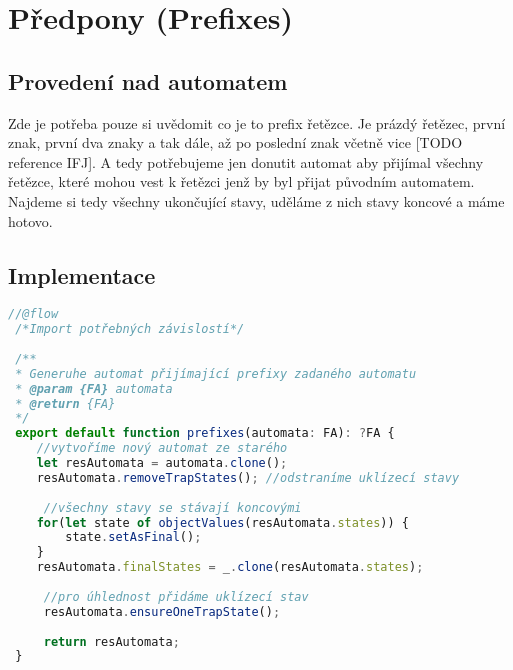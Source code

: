 \section{Předpony (Prefixes)}
\subsection{Provedení nad automatem}
Zde je potřeba pouze si uvědomit co je to prefix řetězce. Je prázdý řetězec, první znak, první dva znaky a tak dále, až po poslední znak včetně vice [TODO reference IFJ].  A tedy potřebujeme jen donutit automat aby přijímal všechny řetězce, které mohou vest k řetězci jenž by byl přijat původním automatem. Najdeme si tedy všechny ukončující stavy, uděláme z nich stavy koncové a máme hotovo.

\subsection{Implementace} 
 \begin{lstlisting}[language=JavaScript,caption={Ukázka implementace Předpon (\textit{src/operations/prefixesFA.js})}]
 //@flow
 /*Import potřebných závislostí*/
 
 /**
 * Generuhe automat přijímající prefixy zadaného automatu
 * @param {FA} automata
 * @return {FA}
 */
 export default function prefixes(automata: FA): ?FA {
 	//vytvoříme nový automat ze starého
 	let resAutomata = automata.clone();
 	resAutomata.removeTrapStates(); //odstraníme uklízecí stavy
 
	 //všechny stavy se stávají koncovými
	for(let state of objectValues(resAutomata.states)) {
 		state.setAsFinal();
 	}
 	resAutomata.finalStates = _.clone(resAutomata.states);
 
	 //pro úhlednost přidáme uklízecí stav
	 resAutomata.ensureOneTrapState();
 
	 return resAutomata;
 }
 \end{lstlisting}